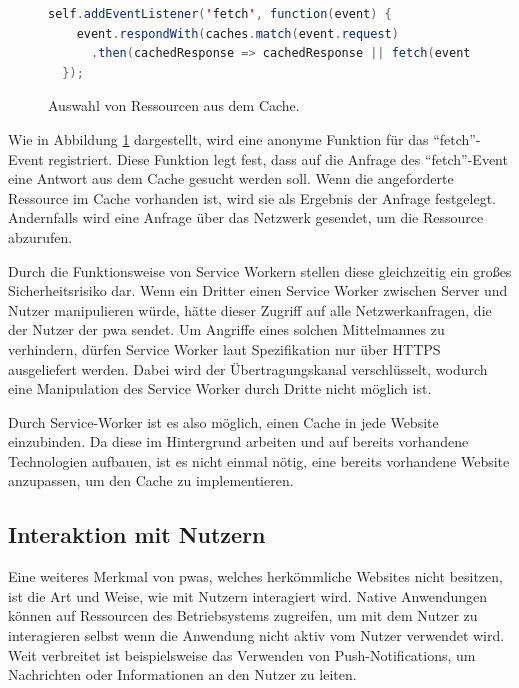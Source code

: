 \documentclass[12pt, parskip=half]{scrartcl}       %
\begin{document}
\begin{figure}[h]
\begin{lstlisting}[language=java]
  self.addEventListener('fetch', function(event) {
    event.respondWith(caches.match(event.request)
      .then(cachedResponse => cachedResponse || fetch(event.request)))
  });
\end{lstlisting}
\caption{Auswahl von Ressourcen aus dem Cache.\cite{heise_pwa2}}
\label{fig:js_cache}
\end{figure}

Wie in Abbildung \ref{fig:js_cache} dargestellt, wird eine anonyme Funktion für das \enquote{fetch}-Event registriert.
Diese Funktion legt fest, dass auf die Anfrage des \enquote{fetch}-Event eine Antwort aus dem Cache gesucht werden soll.
Wenn die angeforderte Ressource im Cache vorhanden ist, wird sie als Ergebnis der Anfrage festgelegt.
Andernfalls wird eine Anfrage über das Netzwerk gesendet, um die Ressource abzurufen.

Durch die Funktionsweise von Service Workern stellen diese gleichzeitig ein großes Sicherheitsrisiko dar.
Wenn ein Dritter einen Service Worker zwischen Server und Nutzer manipulieren würde, hätte dieser Zugriff auf alle Netzwerkanfragen, die der Nutzer der \ac{pwa} sendet.
Um Angriffe eines solchen Mittelmannes zu verhindern, dürfen Service Worker laut Spezifikation nur über HTTPS ausgeliefert werden.
Dabei wird der Übertragungskanal verschlüsselt, wodurch eine Manipulation des Service Worker durch Dritte nicht möglich ist.


Durch Service-Worker ist es also möglich, einen Cache in jede Website einzubinden.
Da diese im Hintergrund arbeiten und auf bereits vorhandene Technologien aufbauen, ist es nicht einmal nötig, eine bereits vorhandene Website anzupassen, um den Cache zu implementieren.


\subsection{Interaktion mit Nutzern}

Eine weiteres Merkmal von \acp{pwa}, welches herkömmliche Websites nicht besitzen, ist die Art und Weise, wie mit Nutzern interagiert wird.
Native Anwendungen können auf Ressourcen des Betriebsystems zugreifen, um mit dem Nutzer zu interagieren selbst wenn die Anwendung nicht aktiv vom Nutzer verwendet wird.
Weit verbreitet ist beispielsweise das Verwenden von Push-Notifications\cite{businessofapps_pushnotificationstatistics}, um Nachrichten oder Informationen an den Nutzer zu leiten.
\end{document}
